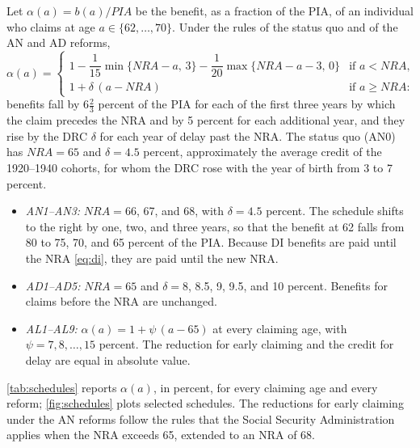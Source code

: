 Let $\alpha(a)=b(a)/PIA$ be the benefit, as a fraction of the PIA, of an individual who claims at age $a\in\{62,\ldots,70\}$. Under the rules of the status quo and of the AN and AD reforms,
\begin{equation*}
\alpha(a)=
\begin{cases}
1-\dfrac{1}{15}\min\{\mathit{NRA}-a,\,3\}-\dfrac{1}{20}\max\{\mathit{NRA}-a-3,\,0\} & \text{if } a<\mathit{NRA},\\[2ex]
1+\delta\,(a-\mathit{NRA}) & \text{if } a\geq \mathit{NRA}:
\end{cases}
\end{equation*}
benefits fall by $6\tfrac{2}{3}$ percent of the PIA for each of the first three years by which the claim precedes the NRA and by 5 percent for each additional year, and they rise by the DRC $\delta$ for each year of delay past the NRA. The status quo (AN0) has $\mathit{NRA}=65$ and $\delta=4.5$ percent, approximately the average credit of the 1920--1940 cohorts, for whom the DRC rose with the year of birth from 3 to 7 percent. %
\begin{itemize}
\item \textit{AN1--AN3:} $\mathit{NRA}=66$, 67, and 68, with $\delta=4.5$ percent. The schedule shifts to the right by one, two, and three years, so that the benefit at 62 falls from 80 to 75, 70, and 65 percent of the PIA. Because DI benefits are paid until the NRA \eqref{eq:di}, they are paid until the new NRA.
\item \textit{AD1--AD5:} $\mathit{NRA}=65$ and $\delta=8$, 8.5, 9, 9.5, and 10 percent. Benefits for claims before the NRA are unchanged.
\item \textit{AL1--AL9:} $\alpha(a)=1+\psi\,(a-65)$ at every claiming age, with $\psi=7,8,\ldots,15$ percent. The reduction for early claiming and the credit for delay are equal in absolute value.
\end{itemize}
\autoref{tab:schedules} reports $\alpha(a)$, in percent, for every claiming age and every reform; \autoref{fig:schedules} plots selected schedules. The reductions for early claiming under the AN reforms follow the rules that the Social Security Administration applies when the NRA exceeds 65, extended to an NRA of 68.

